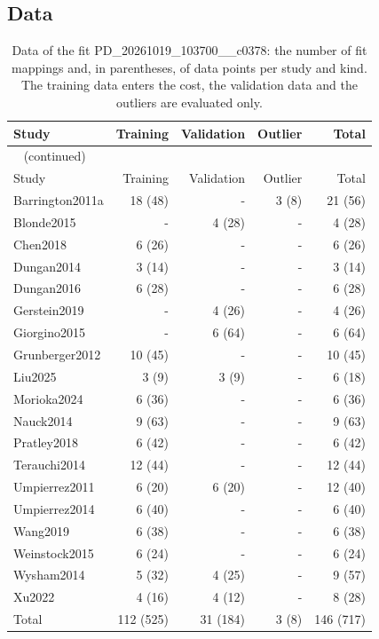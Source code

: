 \documentclass{article}
\begin{document}
\subsection{Data}

\begin{longtable}{lrrrr}
\caption{Data of the fit PD\_20261019\_103700\_\_c0378: the number of fit mappings and, in parentheses, of data points per study and kind. The training data enters the cost, the validation data and the outliers are evaluated only.}\label{tab:data:PD_20261019_103700__c0378} \\
\toprule
Study & Training & Validation & Outlier & Total \\
\midrule
\endfirsthead
\multicolumn{5}{l}{\small\tablename~\thetable{} (continued)} \\
\toprule
Study & Training & Validation & Outlier & Total \\
\midrule
\endhead
\bottomrule
\endlastfoot
Barrington2011a & 18 (48) & - & 3 (8) & 21 (56) \\
Blonde2015 & - & 4 (28) & - & 4 (28) \\
Chen2018 & 6 (26) & - & - & 6 (26) \\
Dungan2014 & 3 (14) & - & - & 3 (14) \\
Dungan2016 & 6 (28) & - & - & 6 (28) \\
Gerstein2019 & - & 4 (26) & - & 4 (26) \\
Giorgino2015 & - & 6 (64) & - & 6 (64) \\
Grunberger2012 & 10 (45) & - & - & 10 (45) \\
Liu2025 & 3 (9) & 3 (9) & - & 6 (18) \\
Morioka2024 & 6 (36) & - & - & 6 (36) \\
Nauck2014 & 9 (63) & - & - & 9 (63) \\
Pratley2018 & 6 (42) & - & - & 6 (42) \\
Terauchi2014 & 12 (44) & - & - & 12 (44) \\
Umpierrez2011 & 6 (20) & 6 (20) & - & 12 (40) \\
Umpierrez2014 & 6 (40) & - & - & 6 (40) \\
Wang2019 & 6 (38) & - & - & 6 (38) \\
Weinstock2015 & 6 (24) & - & - & 6 (24) \\
Wysham2014 & 5 (32) & 4 (25) & - & 9 (57) \\
Xu2022 & 4 (16) & 4 (12) & - & 8 (28) \\
Total & 112 (525) & 31 (184) & 3 (8) & 146 (717) \\
\end{longtable}
\end{document}
